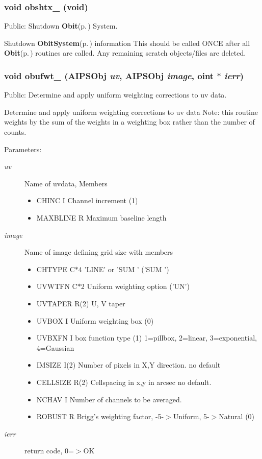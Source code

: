 \subsubsection{\setlength{\rightskip}{0pt plus 5cm}void obshtx\_\- (void)}\label{ObitAIPSFortran_8h_a1}


Public: Shutdown {\bf Obit}{\rm (p.\,\pageref{structObit})} System. 

Shutdown {\bf Obit\-System}{\rm (p.\,\pageref{structObitSystem})} information This should be called ONCE after all {\bf Obit}{\rm (p.\,\pageref{structObit})} routines are called. Any remaining scratch objects/files are deleted. 
\subsubsection{\setlength{\rightskip}{0pt plus 5cm}void obufwt\_\- ({\bf AIPSObj} {\em uv}, {\bf AIPSObj} {\em image}, {\bf oint} $\ast$ {\em ierr})}\label{ObitAIPSFortran_8h_a3}


Public: Determine and apply uniform weighting corrections to uv data. 

Determine and apply uniform weighting corrections to uv data Note: this routine weights by the sum of the weights in a weighting box rather than the number of counts. \begin{Desc}
\item[Parameters:]
\begin{description}
\item[{\em uv}]Name of uvdata, Members \begin{itemize}
\item CHINC I Channel increment (1) \item MAXBLINE R Maximum baseline length \end{itemize}
\item[{\em image}]Name of image defining grid size with members \begin{itemize}
\item CHTYPE C$\ast$4 'LINE' or 'SUM ' ('SUM ') \item UVWTFN C$\ast$2 Uniform weighting option ('UN') \item UVTAPER R(2) U, V taper \item UVBOX I Uniform weighting box (0) \item UVBXFN I box function type (1) 1=pillbox, 2=linear, 3=exponential, 4=Gaussian \item IMSIZE I(2) Number of pixels in X,Y direction. no default \item CELLSIZE R(2) Cellspacing in x,y in arcsec no default. \item NCHAV I Number of channels to be averaged. \item ROBUST R Brigg's weighting factor, -5-$>$Uniform, 5-$>$Natural (0) \end{itemize}
\item[{\em ierr}]return code, 0=$>$OK \end{description}
\end{Desc}
